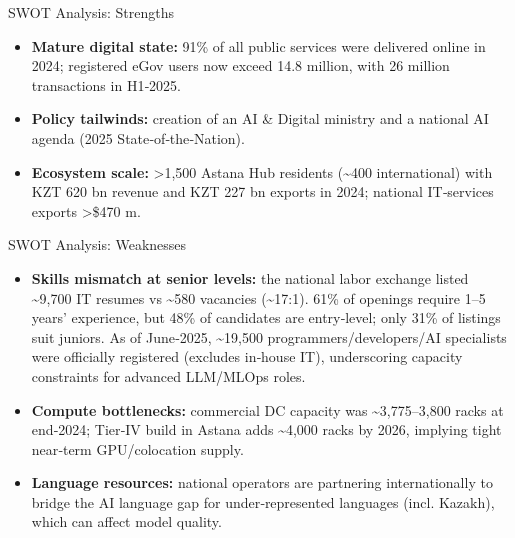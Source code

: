 \documentclass[aspectratio=169,14pt]{beamer}
\begin{document}
\begin{frame}{SWOT Analysis: Strengths}
  \hspace{1.5cm}%
  \begin{minipage}{0.82\textwidth}
    \large
    \begin{itemize}
      \setlength\itemsep{0.8em}
      \item \textbf{\color{Accent}Mature digital state:} 91\% of all public services were delivered online in 2024; registered eGov users now exceed 14.8 million, with 26 million transactions in H1‑2025.

      \item \textbf{\color{Accent}Policy tailwinds:} creation of an AI \& Digital ministry and a national AI agenda (2025 State‑of‑the‑Nation).

      \item \textbf{\color{Accent}Ecosystem scale:} >1,500 Astana Hub residents (\textasciitilde400 international) with KZT 620 bn revenue and KZT 227 bn exports in 2024; national IT‑services exports >\$470 m.
    \end{itemize}
  \end{minipage}
\end{frame}

\begin{frame}{SWOT Analysis: Weaknesses}
  \hspace{1.5cm}%
  \begin{minipage}{0.82\textwidth}
    \begin{itemize}
      \setlength\itemsep{0.7em}
      \item \textbf{\color{Primary}Skills mismatch at senior levels:} the national labor exchange listed \textasciitilde9,700 IT resumes vs \textasciitilde580 vacancies (\textasciitilde17:1). 61\% of openings require 1–5 years' experience, but 48\% of candidates are entry‑level; only 31\% of listings suit juniors. As of June‑2025, \textasciitilde19,500 programmers/developers/AI specialists were officially registered (excludes in‑house IT), underscoring capacity constraints for advanced LLM/MLOps roles.

      \item \textbf{\color{Primary}Compute bottlenecks:} commercial DC capacity was \textasciitilde3,775–3,800 racks at end‑2024; Tier‑IV build in Astana adds \textasciitilde4,000 racks by 2026, implying tight near‑term GPU/colocation supply.

      \item \textbf{\color{Primary}Language resources:} national operators are partnering internationally to bridge the AI language gap for under‑represented languages (incl. Kazakh), which can affect model quality.
    \end{itemize}
  \end{minipage}
\end{frame}
\end{document}
